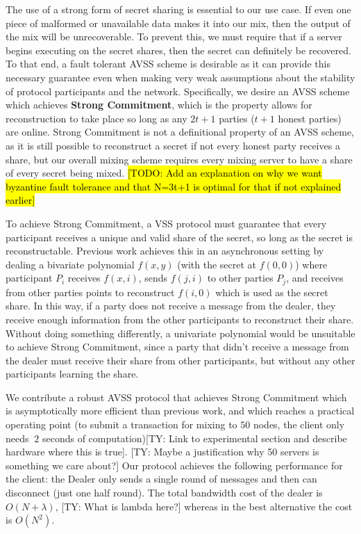 \documentclass{sig-alternate-05-2015}
\newcommand{\tnote}[1]{{\color{green}[TY: #1]}}
\newcommand{\todo}[1]{{\hl{[TODO: #1]}}}
\begin{document}
The use of a strong form of secret sharing is essential to our use case. If even one piece of malformed or unavailable data makes it into our mix, then the output of the mix will be unrecoverable. To prevent this, we must require that if a server begins executing on the secret shares, then the secret can definitely be recovered. To that end, a fault tolerant AVSS scheme is desirable as it can provide this necessary guarantee even when making very weak assumptions about the stability of protocol participants and the network. Specifically, we desire an AVSS scheme which achieves \textbf{Strong Commitment}, which is the property allows for reconstruction to take place so long as any $2t+1$ parties ($t+1$ honest parties) are online. Strong Commitment is not a definitional property of an AVSS scheme, as it is still possible to reconstruct a secret if not every honest party receives a share, but our overall mixing scheme requires every mixing server to have a share of every secret being mixed. \todo{Add an explanation on why we want byzantine fault tolerance and that N=3t+1 is optimal for that if not explained earlier}

To achieve Strong Commitment, a VSS protocol must guarantee that every participant receives a unique and valid share of the secret, so long as the secret is reconstructable. Previous work achieves this in an asynchronous setting by dealing a bivariate polynomial $f(x,y)$ (with the secret at $f(0,0)$) where participant $P_i$ receives $f(x,i)$, sends $f(j,i)$ to other parties $P_j$, and receives from other parties points to reconstruct $f(i,0)$ which is used as the secret share. In this way, if a party does not receive a message from the dealer, they receive enough information from the other participants to reconstruct their share. Without doing something differently, a univariate polynomial would be unsuitable to achieve Strong Commitment, since a party that didn't receive a message from the dealer must receive their share from other participants, but without any other participants learning the share.


We contribute a robust AVSS protocol that achieves Strong Commitment which is asymptotically more efficient than previous work, and which reaches a practical operating point (to submit a transaction for mixing to $50$ nodes, the client only needs $~2$ seconds of computation)\tnote{Link to experimental section and describe hardware where this is true}. \tnote{Maybe a justification why 50 servers is something we care about?}
Our protocol achieves the following performance for the client: the Dealer only sends a single round of messages and then can disconnect (just one half round). The total bandwidth cost of the dealer is $O(N+\lambda)$, \tnote{What is lambda here?} whereas in the best alternative the cost is $O(N^2)$.
\end{document}
